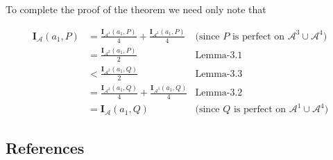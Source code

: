 \documentclass[
  11pt,
  letterpaper,
  DIV=11,
  numbers=noendperiod,
  twoside]{scrartcl}
\begin{document}
To complete the proof of the theorem we need only note that

\[
\begin{aligned}
\mathbf{I}_{\mathscr{A}}(a_1, P) &= \frac{\mathbf{I}_{\mathscr{A}^1}(a_1, P)}{4} + \frac{\mathbf{I}_{\mathscr{A}^2}(a_1, P)}{4} &\text{(since }P\text{ is perfect on }\mathscr{A}^3 \cup \mathscr{A}^4) \\
&= \frac{\mathbf{I}_{\mathscr{A}^2}(a_1, P)}{2} &\text{Lemma-3.1} \\
&< \frac{\mathbf{I}_{\mathscr{A}^2}(a_1, Q)}{2} &\text{Lemma-3.3} \\
&= \frac{\mathbf{I}_{\mathscr{A}^2}(a_1, Q)}{4} + \frac{\mathbf{I}_{\mathscr{A}^3}(a_1, Q)}{4} &\text{Lemma-3.2} \\
&= \mathbf{I}_{\mathscr{A}}(a_1, Q) &\text{(since }Q\text{ is perfect on }\mathscr{A}^1 \cup \mathscr{A}^4)
\end{aligned}
\]

\subsection*{References}\label{references}
\end{document}

